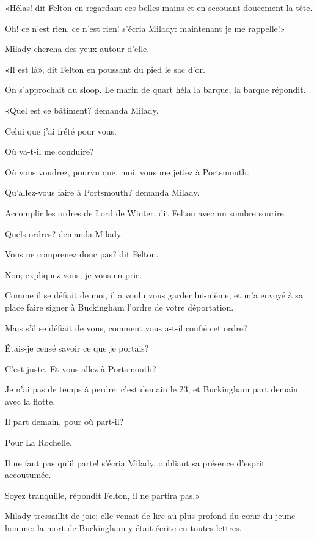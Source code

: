 «Hélas! dit Felton en regardant ces belles mains et en secouant doucement la tête. 

\speak  Oh! ce n'est rien, ce n'est rien! s'écria Milady: maintenant je me rappelle!» 

Milady chercha des yeux autour d'elle. 

«Il est là», dit Felton en poussant du pied le sac d'or. 

On s'approchait du sloop. Le marin de quart héla la barque, la barque répondit. 

«Quel est ce bâtiment? demanda Milady. 

\speak  Celui que j'ai frété pour vous. 

\speak  Où va-t-il me conduire? 

\speak  Où vous voudrez, pourvu que, moi, vous me jetiez à Portsmouth. 

\speak  Qu'allez-vous faire à Portsmouth? demanda Milady. 

\speak  Accomplir les ordres de Lord de Winter, dit Felton avec un sombre sourire. 

\speak  Quels ordres? demanda Milady. 

\speak  Vous ne comprenez donc pas? dit Felton. 

\speak  Non; expliquez-vous, je vous en prie. 

\speak  Comme il se défiait de moi, il a voulu vous garder lui-même, et m'a envoyé à sa place faire signer à Buckingham l'ordre de votre déportation. 

\speak  Mais s'il se défiait de vous, comment vous a-t-il confié cet ordre? 

\speak  Étais-je censé savoir ce que je portais? 

\speak  C'est juste. Et vous allez à Portsmouth? 

\speak  Je n'ai pas de temps à perdre: c'est demain le 23, et Buckingham part demain avec la flotte. 

\speak  Il part demain, pour où part-il? 

\speak  Pour La Rochelle. 

\speak  Il ne faut pas qu'il parte! s'écria Milady, oubliant sa présence d'esprit accoutumée. 

\speak  Soyez tranquille, répondit Felton, il ne partira pas.» 

Milady tressaillit de joie; elle venait de lire au plus profond du cœur du jeune homme: la mort de Buckingham y était écrite en toutes lettres. 

